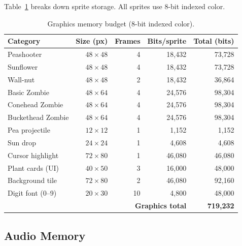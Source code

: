 \documentclass[11pt,letterpaper]{article}
\begin{document}
Table~\ref{tab:gfx-mem} breaks down sprite storage. All sprites use
8-bit indexed color.

\begin{table}[H]
\centering
\caption{Graphics memory budget (8-bit indexed color).}
\label{tab:gfx-mem}
\begin{tabular}{l r r r r}
\toprule
\textbf{Category} & \textbf{Size (px)} & \textbf{Frames} & \textbf{Bits/sprite} & \textbf{Total (bits)} \\
\midrule
Peashooter       & $48\times48$ & 4 & 18{,}432 &  73{,}728 \\
Sunflower        & $48\times48$ & 4 & 18{,}432 &  73{,}728 \\
Wall-nut         & $48\times48$ & 2 & 18{,}432 &  36{,}864 \\
Basic Zombie     & $48\times64$ & 4 & 24{,}576 &  98{,}304 \\
Conehead Zombie  & $48\times64$ & 4 & 24{,}576 &  98{,}304 \\
Buckethead Zombie& $48\times64$ & 4 & 24{,}576 &  98{,}304 \\
Pea projectile   & $12\times12$ & 1 &  1{,}152 &   1{,}152 \\
Sun drop         & $24\times24$ & 1 &  4{,}608 &   4{,}608 \\
Cursor highlight & $72\times80$ & 1 & 46{,}080 &  46{,}080 \\
Plant cards (UI) & $40\times50$ & 3 & 16{,}000 &  48{,}000 \\
Background tile  & $72\times80$ & 2 & 46{,}080 &  92{,}160 \\
Digit font (0--9)& $20\times30$ & 10&  4{,}800 &  48{,}000 \\
\midrule
\multicolumn{4}{r}{\textbf{Graphics total}} & \textbf{719{,}232} \\
\bottomrule
\end{tabular}
\end{table}

\subsection{Audio Memory}
\end{document}
